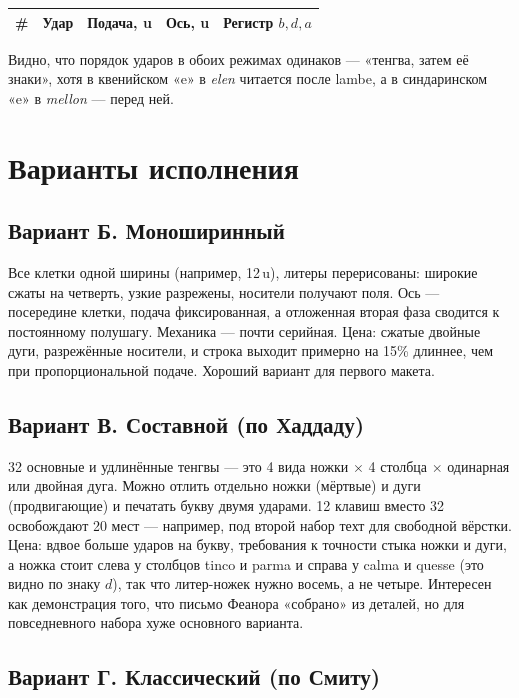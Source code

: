 \documentclass[11pt,a4paper]{article}
\newlength\tgem \setlength\tgem{5mm}
\begin{document}
{\small\setlength\tgem{5mm}
\begin{longtable}{@{}rlrrl@{}}
\toprule
\# & Удар & Подача, u & Ось, u & Регистр $b, d, a$ \\
\midrule\endhead

\bottomrule
\end{longtable}}

\noindent Видно, что порядок ударов в обоих режимах одинаков — «тенгва, затем её знаки», хотя в квенийском «e» в \emph{elen} читается после lambe, а в синдаринском «e» в \emph{mellon} — перед ней.

\section{Варианты исполнения}
\label{sec:variants}

\subsection*{Вариант Б. Моноширинный}

Все клетки одной ширины (например, 12\,u), литеры перерисованы: широкие сжаты на четверть, узкие разрежены, носители получают поля. Ось — посередине клетки, подача фиксированная, а отложенная вторая фаза сводится к постоянному полушагу. Механика — почти серийная. Цена: сжатые двойные дуги, разрежённые носители, и строка выходит примерно на 15\% длиннее, чем при пропорциональной подаче. Хороший вариант для первого макета.

\subsection*{Вариант В. Составной (по Хаддаду)}

32 основные и удлинённые тенгвы — это 4 вида ножки $\times$ 4 столбца $\times$ одинарная или двойная дуга. Можно отлить отдельно ножки (мёртвые) и дуги (продвигающие) и печатать букву двумя ударами. 12 клавиш вместо 32 освобождают 20 мест — например, под второй набор техт для свободной вёрстки. Цена: вдвое больше ударов на букву, требования к точности стыка ножки и дуги, а ножка стоит слева у столбцов tinco и parma и справа у calma и quesse (это видно по знаку $d$), так что литер-ножек нужно восемь, а не четыре. Интересен как демонстрация того, что письмо Феанора «собрано» из деталей, но для повседневного набора хуже основного варианта.

\subsection*{Вариант Г. Классический (по Смиту)}
\end{document}
